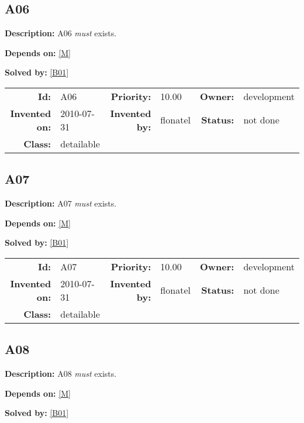\subsection{A06}\label{A06}
\textbf{Description:} A06 \textsl{must} exists.

\textbf{Depends on:} \ref{M} 

\textbf{Solved by:} \ref{B01} 

\par
{\small \begin{center}\begin{tabular}{rlrlrl}
\textbf{Id:} & A06  & \textbf{Priority:} & 10.00  & \textbf{Owner:} & development\\ 
\textbf{Invented on:} & 2010-07-31  & \textbf{Invented by:} & flonatel  & \textbf{Status:} & not done \\ 
\textbf{Class:} & detailable  & & & \end{tabular}\end{center} }

\subsection{A07}\label{A07}
\textbf{Description:} A07 \textsl{must} exists.

\textbf{Depends on:} \ref{M} 

\textbf{Solved by:} \ref{B01} 

\par
{\small \begin{center}\begin{tabular}{rlrlrl}
\textbf{Id:} & A07  & \textbf{Priority:} & 10.00  & \textbf{Owner:} & development\\ 
\textbf{Invented on:} & 2010-07-31  & \textbf{Invented by:} & flonatel  & \textbf{Status:} & not done \\ 
\textbf{Class:} & detailable  & & & \end{tabular}\end{center} }

\subsection{A08}\label{A08}
\textbf{Description:} A08 \textsl{must} exists.

\textbf{Depends on:} \ref{M} 

\textbf{Solved by:} \ref{B01} 

